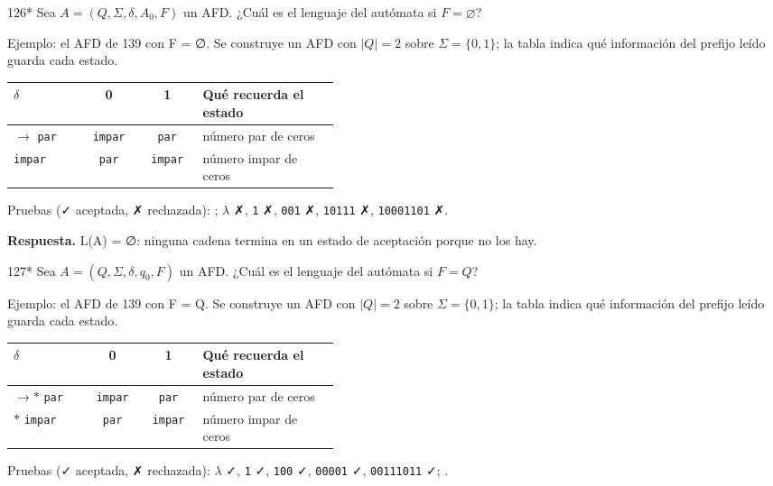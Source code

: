 \documentclass[11pt]{article}
\begin{document}
\begin{ejercicio}{126}{*}
Sea $A = (Q, \Sigma, \delta, A_0, F)$ un AFD. ¿Cuál es el lenguaje del autómata si $F = \varnothing$?
\end{ejercicio}
\proc Ejemplo: el AFD de 139 con F = ∅. Se construye un AFD con $|Q| = 2$ sobre $\Sigma = \{0, 1\}$; la tabla indica qué información del prefijo leído guarda cada estado.
\begin{center}\small\begin{tabular}{lccp{0.42\linewidth}}\toprule
$\delta$ & 0 & 1 & Qué recuerda el estado \\\midrule
$\to$ \texttt{par} & \texttt{impar} & \texttt{par} & número par de ceros \\
 \texttt{impar} & \texttt{par} & \texttt{impar} & número impar de ceros \\
\bottomrule\end{tabular}\end{center}
Pruebas (✓ aceptada, ✗ rechazada): ; $\lambda$ ✗, \texttt{1} ✗, \texttt{001} ✗, \texttt{10111} ✗, \texttt{10001101} ✗.


\textbf{Respuesta.} L(A) = ∅: ninguna cadena termina en un estado de aceptación porque no los hay.



\begin{ejercicio}{127}{*}
Sea $A = (Q, \Sigma, \delta, q_0, F)$ un AFD. ¿Cuál es el lenguaje del autómata si $F = Q$?
\end{ejercicio}
\proc Ejemplo: el AFD de 139 con F = Q. Se construye un AFD con $|Q| = 2$ sobre $\Sigma = \{0, 1\}$; la tabla indica qué información del prefijo leído guarda cada estado.
\begin{center}\small\begin{tabular}{lccp{0.42\linewidth}}\toprule
$\delta$ & 0 & 1 & Qué recuerda el estado \\\midrule
$\to$$*$ \texttt{par} & \texttt{impar} & \texttt{par} & número par de ceros \\
$*$ \texttt{impar} & \texttt{par} & \texttt{impar} & número impar de ceros \\
\bottomrule\end{tabular}\end{center}
Pruebas (✓ aceptada, ✗ rechazada): $\lambda$ ✓, \texttt{1} ✓, \texttt{100} ✓, \texttt{00001} ✓, \texttt{00111011} ✓; .
\end{document}
